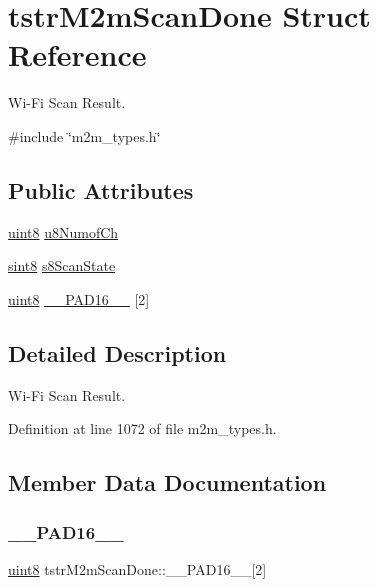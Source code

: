 \hypertarget{structtstrM2mScanDone}{}\section{tstr\+M2m\+Scan\+Done Struct Reference}
\label{structtstrM2mScanDone}


Wi-\/\+Fi Scan Result.  




{\ttfamily \#include \char`\"{}m2m\+\_\+types.\+h\char`\"{}}

\subsection*{Public Attributes}
\begin{DoxyCompactItemize}
\item 
\hyperlink{group__DataT_ga4df709a77647e870bbf1d955b8edc9a6}{uint8} \hyperlink{structtstrM2mScanDone_a1303b806dd93bfdd4b4a51ad750b023b}{u8\+Numof\+Ch}
\item 
\hyperlink{group__DataT_gae35f10ffd0ac8dd2bc3e794da9bdfbc7}{sint8} \hyperlink{structtstrM2mScanDone_adf06f5d0db8d0fb98e7674672ee8439d}{s8\+Scan\+State}
\item 
\hyperlink{group__DataT_ga4df709a77647e870bbf1d955b8edc9a6}{uint8} \hyperlink{structtstrM2mScanDone_a42481d5f2703ab54a9fd28555d705e53}{\+\_\+\+\_\+\+P\+A\+D16\+\_\+\+\_\+} \mbox{[}2\mbox{]}
\end{DoxyCompactItemize}


\subsection{Detailed Description}
Wi-\/\+Fi Scan Result. 

Definition at line 1072 of file m2m\+\_\+types.\+h.



\subsection{Member Data Documentation}
\mbox{\label{structtstrM2mScanDone_a42481d5f2703ab54a9fd28555d705e53}} 
\subsubsection{\texorpdfstring{\+\_\+\+\_\+\+P\+A\+D16\+\_\+\+\_\+}{\_\_PAD16\_\_}}
{\footnotesize\ttfamily \hyperlink{group__DataT_ga4df709a77647e870bbf1d955b8edc9a6}{uint8} tstr\+M2m\+Scan\+Done\+::\+\_\+\+\_\+\+P\+A\+D16\+\_\+\+\_\+\mbox{[}2\mbox{]}}

